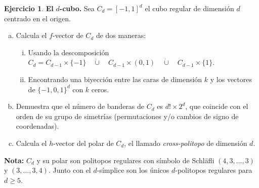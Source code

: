 \documentclass[10pt]{article}
\theoremstyle{definition}
\newtheorem{ejer}{Ejercicio}
\begin{document}
\begin{ejer}\textbf{El }$d$\textbf{-cubo.} Sea $C_d=[-1,1]^d$ el cubo regular de dimensión $d$ centrado en el origen. 
\begin{enumerate}[(a)]
\item Calcula el $f$-vector de $C_d$ de dos maneras: 
\begin{enumerate}[i.]
\item Usando la descomposición $C_d= C_{d-1}\times \{-1\} \quad\dot\cup\quad C_{d-1}\times (0,1) \quad\dot\cup\quad C_{d-1}\times \{1\}$.
\item Encontrando una biyección entre las caras de dimensión $k$ y los vectores de $\{-1,0,1\}^d$ con $k$ ceros.
\end{enumerate}

\item Demuestra que el número de banderas de $C_d$ es $d!\times 2^d$, que coincide con el orden de su grupo de simetrías (permutaciones y/o cambios de signo de coordenadas).

\item Calcula el $h$-vector del polar de $C_d$, el llamado \emph{cross-politopo} de dimensión $d$.
\end{enumerate}
{\bf Nota:} $C_d$ y su polar son politopos regulares con símbolo de Schl\"afli $(4,3,\dots,3)$ y $(3,\dots,3,4)$. Junto con el $d$-símplice son los únicos $d$-politopos regulares para $d\ge 5$.


\end{ejer}
\end{document}
